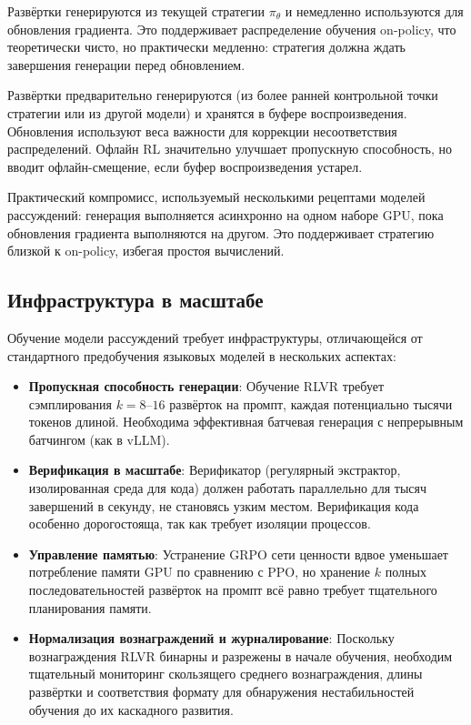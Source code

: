 \begin{description}[leftmargin=!,labelwidth=3.5cm]
\item[Онлайн RL] Развёртки генерируются из текущей стратегии
  $\pi_\theta$ и немедленно используются для обновления градиента. Это поддерживает
  распределение обучения on-policy, что теоретически чисто,
  но практически медленно: стратегия должна ждать завершения генерации
  перед обновлением.

\item[Офлайн RL] Развёртки предварительно генерируются (из более ранней
  контрольной точки стратегии или из другой модели) и хранятся в
  буфере воспроизведения. Обновления используют веса важности для коррекции
  несоответствия распределений. Офлайн RL значительно улучшает
  пропускную способность, но вводит офлайн-смещение, если буфер воспроизведения устарел.

\item[Асинхронный RL] Практический компромисс, используемый несколькими
  рецептами моделей рассуждений: генерация выполняется асинхронно на одном наборе
  GPU, пока обновления градиента выполняются на другом. Это поддерживает
  стратегию близкой к on-policy, избегая простоя вычислений.
\end{description}

\subsection{Инфраструктура в масштабе}
\label{subsec:infra}

Обучение модели рассуждений требует инфраструктуры, отличающейся от
стандартного предобучения языковых моделей в нескольких аспектах:

\begin{itemize}[leftmargin=*]
\item \textbf{Пропускная способность генерации}: Обучение RLVR требует сэмплирования
  $k = 8$--$16$ развёрток на промпт, каждая потенциально тысячи
  токенов длиной. Необходима эффективная батчевая генерация с непрерывным батчингом
  (как в vLLM).

\item \textbf{Верификация в масштабе}: Верификатор (регулярный экстрактор,
  изолированная среда для кода) должен работать параллельно для тысяч завершений в
  секунду, не становясь узким местом. Верификация кода
  особенно дорогостояща, так как требует изоляции процессов.

\item \textbf{Управление памятью}: Устранение GRPO сети ценности
  вдвое уменьшает потребление памяти GPU по сравнению с PPO, но хранение
  $k$ полных последовательностей развёрток на промпт всё равно требует тщательного планирования памяти.

\item \textbf{Нормализация вознаграждений и журналирование}: Поскольку вознаграждения RLVR
  бинарны и разрежены в начале обучения, необходим тщательный мониторинг
  скользящего среднего вознаграждения, длины развёртки и соответствия формату
  для обнаружения нестабильностей обучения до их каскадного развития.
\end{itemize}

